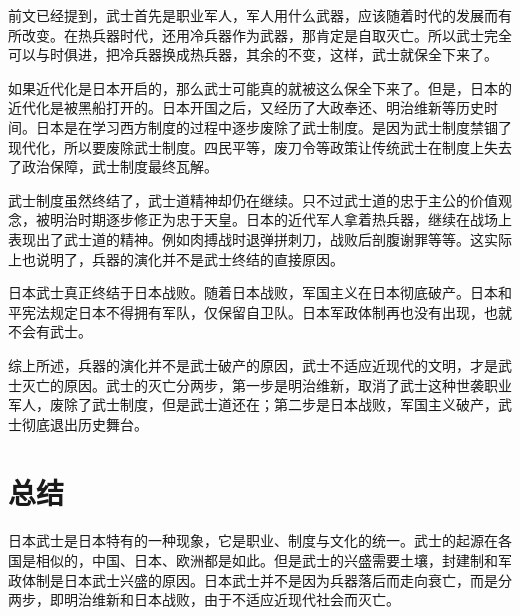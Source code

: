 \documentclass[utf8,a4paper]{ctexart}
\begin{document}
前文已经提到，武士首先是职业军人，军人用什么武器，应该随着时代的发展而有所改变。在热兵器时代，还用冷兵器作为武器，那肯定是自取灭亡。所以武士完全可以与时俱进，把冷兵器换成热兵器，其余的不变，这样，武士就保全下来了。

如果近代化是日本开启的，那么武士可能真的就被这么保全下来了。但是，日本的近代化是被黑船打开的。日本开国之后，又经历了大政奉还、明治维新等历史时间。日本是在学习西方制度的过程中逐步废除了武士制度。是因为武士制度禁锢了现代化，所以要废除武士制度。四民平等，废刀令等政策让传统武士在制度上失去了政治保障，武士制度最终瓦解。

武士制度虽然终结了，武士道精神却仍在继续。只不过武士道的忠于主公的价值观念，被明治时期逐步修正为忠于天皇。日本的近代军人拿着热兵器，继续在战场上表现出了武士道的精神。例如肉搏战时退弹拼刺刀，战败后剖腹谢罪等等。这实际上也说明了，兵器的演化并不是武士终结的直接原因。

日本武士真正终结于日本战败。随着日本战败，军国主义在日本彻底破产。日本和平宪法规定日本不得拥有军队，仅保留自卫队。日本军政体制再也没有出现，也就不会有武士。

综上所述，兵器的演化并不是武士破产的原因，武士不适应近现代的文明，才是武士灭亡的原因。武士的灭亡分两步，第一步是明治维新，取消了武士这种世袭职业军人，废除了武士制度，但是武士道还在；第二步是日本战败，军国主义破产，武士彻底退出历史舞台。

\section{总结}
日本武士是日本特有的一种现象，它是职业、制度与文化的统一。武士的起源在各国是相似的，中国、日本、欧洲都是如此。但是武士的兴盛需要土壤，封建制和军政体制是日本武士兴盛的原因。日本武士并不是因为兵器落后而走向衰亡，而是分两步，即明治维新和日本战败，由于不适应近现代社会而灭亡。




\newpage
\end{document}
